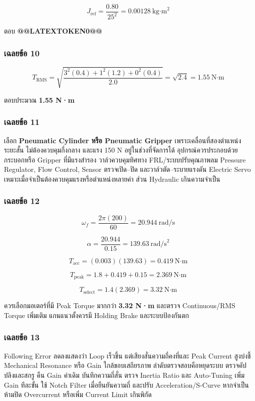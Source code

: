 \[
J_{\text{ref}}=\frac{0.80}{25^2}
=0.00128\ \text{kg·m}^2
\]

ตอบ \textbf{@@LATEXTOKEN0@@}

\subsubsection{เฉลยข้อ 10}

\[
T_{\text{RMS}}
=
\sqrt{
\frac{3^2(0.4)+1^2(1.2)+0^2(0.4)}{2.0}
}
=
\sqrt{2.4}
=
1.55\ \text{N·m}
\]

ตอบประมาณ \textbf{1.55 N·m}

\subsubsection{เฉลยข้อ 11}

เลือก \textbf{Pneumatic Cylinder หรือ Pneumatic Gripper} เพราะเคลื่อนที่สองตำแหน่ง ระยะสั้น ไม่ต้องควบคุมกึ่งกลาง และแรง 150 N อยู่ในช่วงที่จัดการได้ อุปกรณ์ควรประกอบด้วยกระบอกหรือ Gripper ที่มีแรงสำรอง วาล์วควบคุมทิศทาง FRL/ระบบปรับคุณภาพลม Pressure Regulator, Flow Control, Sensor ตรวจเปิด–ปิด และวาล์วตัด–ระบายแรงดัน Electric Servo เหมาะเมื่อจำเป็นต้องควบคุมแรงหรือตำแหน่งหลายค่า ส่วน Hydraulic เกินความจำเป็น

\subsubsection{เฉลยข้อ 12}

\[
\omega_f=\frac{2\pi(200)}{60}=20.944\ \text{rad/s}
\]

\[
\alpha=\frac{20.944}{0.15}=139.63\ \text{rad/s}^2
\]

\[
T_{\text{acc}}=(0.003)(139.63)=0.419\ \text{N·m}
\]

\[
T_{\text{peak}}
=
1.8+0.419+0.15
=
2.369\ \text{N·m}
\]

\[
T_{\text{select}}=1.4(2.369)=3.32\ \text{N·m}
\]

ควรเลือกมอเตอร์ที่มี Peak Torque มากกว่า \textbf{3.32 N·m} และตรวจ Continuous/RMS Torque เพิ่มเติม แกนแนวตั้งควรมี Holding Brake และระบบป้องกันตก

\subsubsection{เฉลยข้อ 13}

Following Error ลดลงแสดงว่า Loop เร็วขึ้น แต่เสียงสั่นความถี่คงที่และ Peak Current สูงบ่งชี้ Mechanical Resonance หรือ Gain ใกล้ขอบเสถียรภาพ ลำดับตรวจสอบคือหยุดระบบ ตรวจคัปปลิงและสกรู คืน Gain ค่าเดิม บันทึกความถี่สั่น ตรวจ Inertia Ratio และ Auto-Tuning เพิ่ม Gain ทีละขั้น ใช้ Notch Filter เมื่อยืนยันความถี่ และปรับ Acceleration/S-Curve หากจำเป็น ห้ามปิด Overcurrent หรือเพิ่ม Current Limit เกินพิกัด

